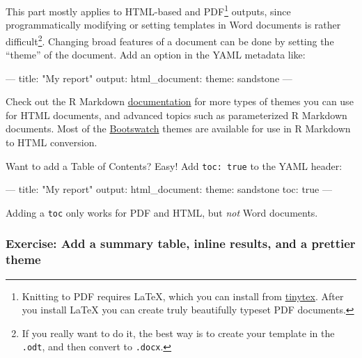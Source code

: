 \documentclass[]{Nemilov}
\newenvironment{Shaded}{\begin{snugshade}}{\end{snugshade}}
\newcommand{\AttributeTok}[1]{\textcolor[rgb]{0.77,0.63,0.00}{#1}}
\newcommand{\FunctionTok}[1]{\textcolor[rgb]{0.00,0.00,0.00}{#1}}
\newcommand{\OtherTok}[1]{\textcolor[rgb]{0.56,0.35,0.01}{#1}}
\newcommand{\StringTok}[1]{\textcolor[rgb]{0.31,0.60,0.02}{#1}}
\begin{document}
This part mostly applies to HTML-based and PDF\footnote{Knitting to PDF requires LaTeX, which you can install from \href{https://yihui.name/tinytex/}{tinytex}.
  After you install LaTeX you can create truly beautifully typeset PDF documents.} outputs, since
programmatically modifying or setting templates in Word documents is rather
difficult\footnote{If you really want to do it, the best way is to create your
  template in the \texttt{.odt}, and then convert to \texttt{.docx}.}. Changing broad features of a document can be done by
setting the ``theme'' of the document. Add an option in the YAML metadata like:

\begin{Shaded}
\begin{Highlighting}[]
\OtherTok{---}
\FunctionTok{title:}\AttributeTok{ }\StringTok{"My report"}
\FunctionTok{output:}
    \FunctionTok{html_document:}
        \FunctionTok{theme:}\AttributeTok{ sandstone}
\OtherTok{---}
\end{Highlighting}
\end{Shaded}

Check out the R Markdown \href{FIXME}{documentation} for more types of
themes you can use for HTML documents, and advanced topics such as parameterized
R Markdown documents. Most of the \href{https://bootswatch.com/3/}{Bootswatch} themes are available
for use in R Markdown to HTML conversion.

Want to add a Table of Contents? Easy! Add \texttt{toc:\ true} to the YAML header:

\begin{Shaded}
\begin{Highlighting}[]
\OtherTok{---}
\FunctionTok{title:}\AttributeTok{ }\StringTok{"My report"}
\FunctionTok{output:}
    \FunctionTok{html_document:}
        \FunctionTok{theme:}\AttributeTok{ sandstone}
        \FunctionTok{toc:}\AttributeTok{ true}
\OtherTok{---}
\end{Highlighting}
\end{Shaded}

Adding a \texttt{toc} only works for PDF and HTML, but \emph{not} Word documents.

\hypertarget{exercise-add-a-summary-table-inline-results-and-a-prettier-theme}{%
\subsubsection{Exercise: Add a summary table, inline results, and a prettier theme}\label{exercise-add-a-summary-table-inline-results-and-a-prettier-theme}}
\end{document}
